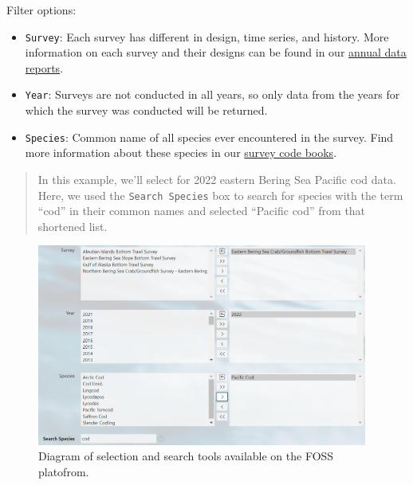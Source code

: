 \documentclass[
  letterpaper,
  oneside,
  open=any]{scrbook}
\providecommand{\tightlist}{%
  \setlength{\itemsep}{0pt}\setlength{\parskip}{0pt}}\usepackage{longtable,booktabs,array}
\begin{document}
Filter options:

\begin{itemize}
\tightlist
\item
  \texttt{Survey}: Each survey has different in design, time series, and
  history. More information on each survey and their designs can be
  found in our
  \href{https://www.fisheries.noaa.gov/alaska/science-data/groundfish-assessment-program-bottom-trawl-surveys\#data-products}{annual
  data reports}.
\item
  \texttt{Year}: Surveys are not conducted in all years, so only data
  from the years for which the survey was conducted will be returned.
\item
  \texttt{Species}: Common name of all species ever encountered in the
  survey. Find more information about these species in our
  \href{https://www.fisheries.noaa.gov/resource/document/groundfish-survey-species-code-manual-and-data-codes-manual}{survey
  code books}.
\end{itemize}

\begin{quote}
In this example, we'll select for 2022 eastern Bering Sea Pacific cod
data. Here, we used the \texttt{Search\ Species} box to search for
species with the term ``cod'' in their common names and selected
``Pacific cod'' from that shortened list.
\end{quote}

\begin{figure}

{\centering \includegraphics[width=4.27in,height=\textheight]{content/../img/foss_3_selected.png}

}

\caption{Diagram of selection and search tools available on the FOSS
platofrom.}

\end{figure}
\end{document}
